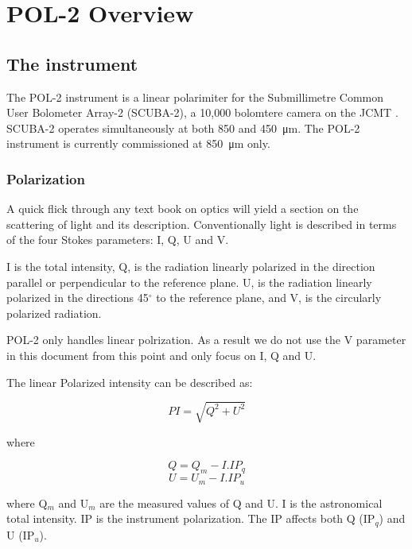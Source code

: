 \chapter{POL-2 Overview}
\label{sec:pol2}
\section{The instrument}

The POL-2 instrument is a linear polarimiter for the 
Submillimetre Common User Bolometer Array-2 (SCUBA-2), a 10,000 
bolomtere camera on the JCMT \cite{Friberg}\cite{Bastien2011}. SCUBA-2 operates
simultaneously at both 850 and \SI{450}{\micro\metre}. The POL-2
instrument is currently commissioned at \SI{850}{\micro\metre} only.


\subsection*{Polarization}

A quick flick through any text book on optics will yield a section
on the scattering of light and its description. Conventionally light
is described in terms of the four Stokes parameters: I, Q, U and V.


I is the total intensity, Q, is the radiation linearly polarized in the
direction parallel or perpendicular to the reference plane. U, is the
radiation linearly polarized in the directions 45$^{\circ }$ to the
reference plane, and V, is the circularly polarized radiation. 

POL-2 only handles linear polrization. As a result we do not use
the V parameter in this document from this point and only focus
on I, Q and U.

The linear Polarized intensity can be described as:

\begin{equation}
PI = \sqrt{Q^{2}+U^{2}}
\end{equation}

where 

\begin{equation}
Q = Q_{m} - I . IP_{q} 
\end{equation}
\begin{equation}
U = U_{m} - I . IP_{u}
\end{equation}

where Q$_{m}$ and U$_{m}$ are the measured values of Q and U.
I is the astronomical total intensity.
IP is the instrument polarization. The IP affects both Q 
(IP$_{q}$) and U (IP$_{u}$).


